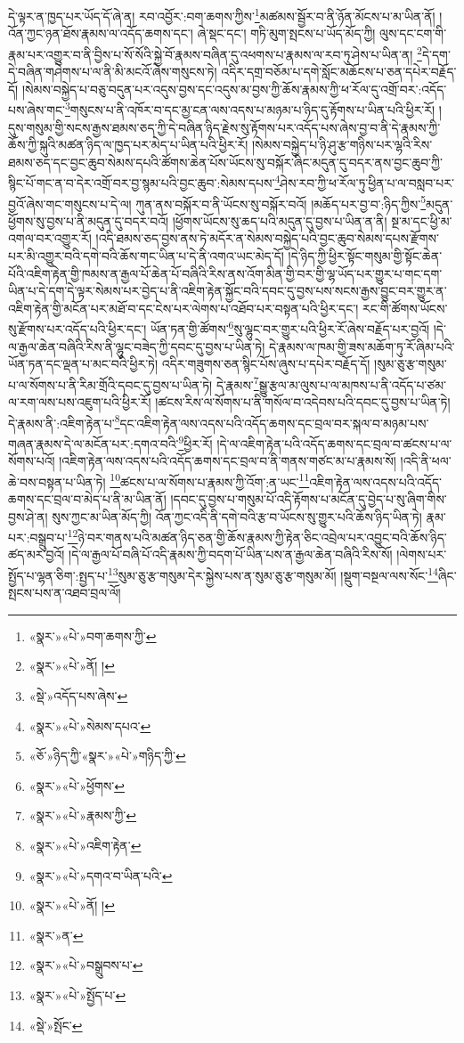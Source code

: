 དེ་ལྟར་ན་ཁྱད་པར་ཡོད་དོ་ཞེ་ན། རབ་འབྱོར་:བག་ཆགས་ཀྱིས་\footnote{«སྣར་»«པེ་»བག་ཆགས་ཀྱི་}མཚམས་སྦྱོར་བ་ནི་ཉོན་མོངས་པ་མ་ཡིན་ནོ། །འོན་ཀྱང་ཉན་ཐོས་རྣམས་ལ་འདོད་ཆགས་དང་། ཞེ་སྡང་དང་། གཏི་མུག་སྤངས་པ་ཡོད་མོད་ཀྱི། ལུས་དང་ངག་གི་རྣམ་པར་འགྱུར་བ་ནི་བྱིས་པ་སོ་སོའི་སྐྱེ་བོ་རྣམས་བཞིན་དུ་འཕགས་པ་རྣམས་ལ་རབ་ཏུ་ཤེས་པ་ཡིན་ན། \footnote{«སྣར་»«པེ་»ནོ། ། }དེ་དག་དེ་བཞིན་གཤེགས་པ་ལ་ནི་མི་མངའོ་ཞེས་གསུངས་ཏེ། འདིར་དགྲ་བཅོམ་པ་དགེ་སློང་མཆོངས་པ་ཅན་དཔེར་བརྗོད་དོ། །སེམས་བསྐྱེད་པ་བཅུ་བདུན་པར་འདུས་བྱས་དང་འདུས་མ་བྱས་ཀྱི་ཆོས་རྣམས་ཀྱི་ཕ་རོལ་དུ་འགྲོ་བར་:འདོད་པས་ཞེས་གང་\footnote{«སྡེ་»འདོད་པས་ཞེས་}གསུངས་པ་ནི་འཁོར་བ་དང་མྱ་ངན་ལས་འདས་པ་མཉམ་པ་ཉིད་དུ་རྟོགས་པ་ཡིན་པའི་ཕྱིར་རོ། །དུས་གསུམ་གྱི་སངས་རྒྱས་ཐམས་ཅད་ཀྱི་དེ་བཞིན་ཉིད་རྗེས་སུ་རྟོགས་པར་འདོད་པས་ཞེས་བྱ་བ་ནི་དེ་རྣམས་ཀྱི་ཆོས་ཀྱི་སྐུའི་མཚན་ཉིད་ལ་ཁྱད་པར་མེད་པ་ཡིན་པའི་ཕྱིར་རོ། །སེམས་བསྐྱེད་པ་ཉི་ཤུ་རྩ་གཉིས་པར་ལྷའི་རིས་ཐམས་ཅད་དང་བྱང་ཆུབ་སེམས་དཔའི་ཚོགས་ཆེན་པོས་ཡོངས་སུ་བསྐོར་ཞིང་མདུན་དུ་བདར་ནས་བྱང་ཆུབ་ཀྱི་སྙིང་པོ་གང་ན་བ་དེར་འགྲོ་བར་བྱ་སྙམ་པའི་བྱང་ཆུབ་:སེམས་དཔས་\footnote{«སྣར་»«པེ་»སེམས་དཔའ་}ཤེས་རབ་ཀྱི་ཕ་རོལ་ཏུ་ཕྱིན་པ་ལ་བསླབ་པར་བྱའོ་ཞེས་གང་གསུངས་པ་དེ་ལ། ཀུན་ནས་བསྐོར་བ་ནི་ཡོངས་སུ་བསྐོར་བའོ། །མཆོད་པར་བྱ་བ་:ཉིད་ཀྱིས་\footnote{«ཅོ་»ཉིད་ཀྱི་«སྣར་»«པེ་»གཉིད་ཀྱི་}མདུན་ཕྱོགས་སུ་བྱས་པ་ནི་མདུན་དུ་བདར་བའོ། །ཕྱོགས་ཡོངས་སུ་ཆད་པའི་མདུན་དུ་བྱས་པ་ཡིན་ན་ནི། སྔ་མ་དང་ཕྱི་མ་འགལ་བར་འགྱུར་རོ། །འདི་ཐམས་ཅད་བྱས་ནས་ཏེ་མདོར་ན་སེམས་བསྐྱེད་པའི་བྱང་ཆུབ་སེམས་དཔས་རྫོགས་པར་མི་འགྱུར་བའི་དགེ་བའི་ཆོས་གང་ཡིན་པ་དེ་ནི་འགའ་ཡང་མེད་དོ། །དེ་ཉིད་ཀྱི་ཕྱིར་སྟོང་གསུམ་གྱི་སྟོང་ཆེན་པོའི་འཇིག་རྟེན་གྱི་ཁམས་ན་རྒྱལ་པོ་ཆེན་པོ་བཞིའི་རིས་ནས་འོག་མིན་གྱི་བར་གྱི་ལྷ་ཡོད་པར་གྱུར་པ་གང་དག་ཡིན་པ་དེ་དག་དེ་ལྟར་སེམས་པར་བྱེད་པ་ནི་འཇིག་རྟེན་སྐྱོང་བའི་དབང་དུ་བྱས་པས་སངས་རྒྱས་བྱུང་བར་གྱུར་ན་འཇིག་རྟེན་གྱི་མངོན་པར་མཐོ་བ་དང་ངེས་པར་ལེགས་པ་འཐོབ་པར་བསྟན་པའི་ཕྱིར་དང་། རང་གི་ཚོགས་ཡོངས་སུ་རྫོགས་པར་འདོད་པའི་ཕྱིར་དང་། ཡོན་ཏན་གྱི་ཚོགས་\footnote{«སྣར་»«པེ་»ཕྱོགས་}སུ་ལྷུང་བར་གྱུར་པའི་ཕྱིར་རོ་ཞེས་བརྗོད་པར་བྱའོ། །དེ་ལ་རྒྱལ་ཆེན་བཞིའི་རིས་ནི་ལྷུང་བཟེད་ཀྱི་དབང་དུ་བྱས་པ་ཡིན་ཏེ། དེ་རྣམས་ལ་ཁམ་གྱི་ཟས་མཆོག་ཏུ་རོ་ཞིམ་པའི་ཡོན་ཏན་དང་ལྡན་པ་མང་བའི་ཕྱིར་ཏེ། འདིར་གཟུགས་ཅན་སྙིང་པོས་ཞུས་པ་དཔེར་བརྗོད་དོ། །སུམ་ཅུ་རྩ་གསུམ་པ་ལ་སོགས་པ་ནི་རིམ་གྲོའི་དབང་དུ་བྱས་པ་ཡིན་ཏེ། དེ་རྣམས་\footnote{«སྣར་»«པེ་»རྣམས་ཀྱི་}སྒྱུ་རྩལ་མ་ལུས་པ་ལ་མཁས་པ་ནི་འདོད་པ་ཙམ་ལ་རག་ལས་པས་འཇུག་པའི་ཕྱིར་རོ། །ཚངས་རིས་ལ་སོགས་པ་ནི་གསོལ་བ་འདེབས་པའི་དབང་དུ་བྱས་པ་ཡིན་ཏེ། དེ་རྣམས་ནི་:འཇིག་རྟེན་པ་\footnote{«སྣར་»«པེ་»འཇིག་རྟེན་}དང་འཇིག་རྟེན་ལས་འདས་པའི་འདོད་ཆགས་དང་བྲལ་བར་སྐལ་བ་མཉམ་པས་གཞན་རྣམས་དེ་ལ་མངོན་པར་:དགའ་བའི་\footnote{«སྣར་»«པེ་»དགའ་བ་ཡིན་པའི་}ཕྱིར་རོ། །དེ་ལ་འཇིག་རྟེན་པའི་འདོད་ཆགས་དང་བྲལ་བ་ཚངས་པ་ལ་སོགས་པའོ། །འཇིག་རྟེན་ལས་འདས་པའི་འདོད་ཆགས་དང་བྲལ་བ་ནི་གནས་གཙང་མ་པ་རྣམས་སོ། །འདི་ནི་ཕལ་ཆེ་བས་བསྟན་པ་ཡིན་ཏེ། \footnote{«སྣར་»«པེ་»ནོ། ། }ཚངས་པ་ལ་སོགས་པ་རྣམས་ཀྱི་འོག་:ན་ཡང་\footnote{«སྣར་»ན་}འཇིག་རྟེན་ལས་འདས་པའི་འདོད་ཆགས་དང་བྲལ་བ་མེད་པ་ནི་མ་ཡིན་ནོ། །དབང་དུ་བྱས་པ་གསུམ་པོ་འདི་རྟོགས་པ་མངོན་དུ་བྱེད་པ་སུ་ཞིག་གིས་བྱས་ཤེ་ན། སུས་ཀྱང་མ་ཡིན་མོད་ཀྱི། འོན་ཀྱང་འདི་ནི་དགེ་བའི་རྩ་བ་ཡོངས་སུ་གྱུར་པའི་ཆོས་ཉིད་ཡིན་ཏེ། རྣམ་པར་:བསྒྲུབ་པ་\footnote{«སྣར་»«པེ་»བསྒྲུབས་པ་}ཉེ་བར་གནས་པའི་མཚན་ཉིད་ཅན་གྱི་ཆོས་རྣམས་ཀྱི་རྟེན་ཅིང་འབྲེལ་པར་འབྱུང་བའི་ཆོས་ཉིད་ཚད་མར་བྱའོ། །དེ་ལ་རྒྱལ་པོ་བཞི་པོ་འདི་རྣམས་ཀྱི་བདག་པོ་ཡིན་པས་ན་རྒྱལ་ཆེན་བཞིའི་རིས་སོ། །ལེགས་པར་སྤྱོད་པ་ལྷན་ཅིག་:སྤྱད་པ་\footnote{«སྣར་»«པེ་»སྤྱོད་པ་}སུམ་ཅུ་རྩ་གསུམ་དེར་སྐྱེས་པས་ན་སུམ་ཅུ་རྩ་གསུམ་མོ། །སྡུག་བསྔལ་ལས་སོང་\footnote{«སྡེ་»སྤོང་}ཞིང་སྤངས་པས་ན་འཐབ་བྲལ་ལོ། 